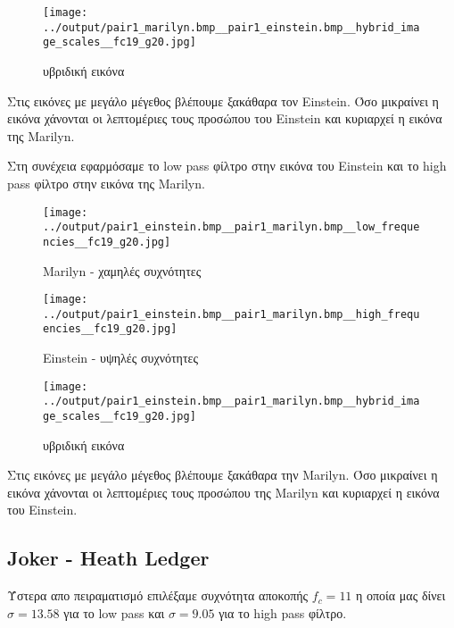 \documentclass[11pt]{scrartcl} %
\begin{document}
\begin{figure}[H]
  \texttt{[image: ../output/pair1\_marilyn.bmp\_\_pair1\_einstein.bmp\_\_hybrid\_image\_scales\_\_fc19\_g20.jpg]}
  \caption{υβριδική εικόνα}
\end{figure}

Στις εικόνες με μεγάλο μέγεθος βλέπουμε ξακάθαρα τον Einstein. Όσο μικραίνει η εικόνα χάνονται οι λεπτομέριες τους προσώπου του Einstein και κυριαρχεί η εικόνα της Marilyn.

Στη συνέχεια εφαρμόσαμε το low pass φίλτρο στην εικόνα του Einstein και το high pass φίλτρο στην εικόνα της Marilyn.

\begin{figure}[H]
  \begin{minipage}[c]{8cm}
    \texttt{[image: ../output/pair1\_einstein.bmp\_\_pair1\_marilyn.bmp\_\_low\_frequencies\_\_fc19\_g20.jpg]}
    \caption{Marilyn - χαμηλές συχνότητες}
  \end{minipage}
  \begin{minipage}[c]{8cm}
    \texttt{[image: ../output/pair1\_einstein.bmp\_\_pair1\_marilyn.bmp\_\_high\_frequencies\_\_fc19\_g20.jpg]}
    \caption{Einstein - υψηλές συχνότητες}
  \end{minipage}
\end{figure}

\begin{figure}[H]
  \texttt{[image: ../output/pair1\_einstein.bmp\_\_pair1\_marilyn.bmp\_\_hybrid\_image\_scales\_\_fc19\_g20.jpg]}
  \caption{υβριδική εικόνα}
\end{figure}

Στις εικόνες με μεγάλο μέγεθος βλέπουμε ξακάθαρα την Marilyn. Όσο μικραίνει η εικόνα χάνονται οι λεπτομέριες τους προσώπου της Marilyn και κυριαρχεί η εικόνα του Einstein.

\subsection{Joker - Heath Ledger}

Ύστερα απο πειραματισμό επιλέξαμε συχνότητα αποκοπής $f_c = 11$ η οποία μας δίνει $\sigma = 13.58$ για το low pass και $\sigma = 9.05$ για το high pass φίλτρο.
\end{document}
